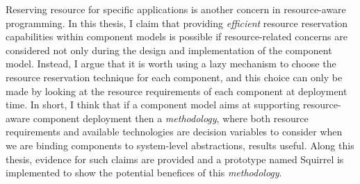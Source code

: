 Reserving resource for specific applications is another concern in resource-aware programming.
In this thesis, I claim that providing \textit{efficient} resource reservation capabilities within component models is possible if resource-related concerns are considered not only during the design and implementation of the component model.
Instead, I argue that it is worth using a lazy mechanism to choose the resource reservation technique for each component, and this choice can only be made by looking at the resource requirements of each component at deployment time.
In short, I think that if a component model aims at supporting resource-aware component deployment then a \textit{methodology}, where both resource requirements and available technologies are decision variables to consider when we are binding components to system-level abstractions, results useful.
Along this thesis, evidence for such claims are provided and a prototype named Squirrel is implemented to show the potential benefices of this \textit{methodology}.


